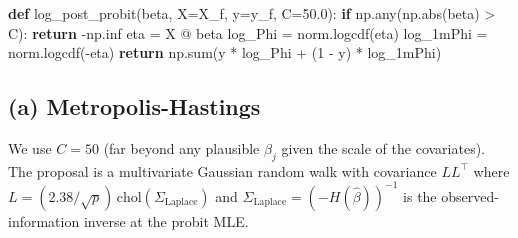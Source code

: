 \documentclass[
  letterpaper,
  DIV=11,
  numbers=noendperiod]{scrartcl}
\newenvironment{Shaded}{\begin{snugshade}}{\end{snugshade}}
\newcommand{\BuiltInTok}[1]{\textcolor[rgb]{0.00,0.23,0.31}{#1}}
\newcommand{\ControlFlowTok}[1]{\textcolor[rgb]{0.00,0.23,0.31}{\textbf{#1}}}
\newcommand{\DecValTok}[1]{\textcolor[rgb]{0.68,0.00,0.00}{#1}}
\newcommand{\FloatTok}[1]{\textcolor[rgb]{0.68,0.00,0.00}{#1}}
\newcommand{\KeywordTok}[1]{\textcolor[rgb]{0.00,0.23,0.31}{\textbf{#1}}}
\newcommand{\NormalTok}[1]{\textcolor[rgb]{0.00,0.23,0.31}{#1}}
\newcommand{\OperatorTok}[1]{\textcolor[rgb]{0.37,0.37,0.37}{#1}}
\begin{document}
\begin{Shaded}
\begin{Highlighting}[]
\KeywordTok{def}\NormalTok{ log\_post\_probit(beta, X}\OperatorTok{=}\NormalTok{X\_f, y}\OperatorTok{=}\NormalTok{y\_f, C}\OperatorTok{=}\FloatTok{50.0}\NormalTok{):}
    \ControlFlowTok{if}\NormalTok{ np.}\BuiltInTok{any}\NormalTok{(np.}\BuiltInTok{abs}\NormalTok{(beta) }\OperatorTok{\textgreater{}}\NormalTok{ C):}
        \ControlFlowTok{return} \OperatorTok{{-}}\NormalTok{np.inf}
\NormalTok{    eta }\OperatorTok{=}\NormalTok{ X }\OperatorTok{@}\NormalTok{ beta}
\NormalTok{    log\_Phi   }\OperatorTok{=}\NormalTok{ norm.logcdf(eta)}
\NormalTok{    log\_1mPhi }\OperatorTok{=}\NormalTok{ norm.logcdf(}\OperatorTok{{-}}\NormalTok{eta)}
    \ControlFlowTok{return}\NormalTok{ np.}\BuiltInTok{sum}\NormalTok{(y }\OperatorTok{*}\NormalTok{ log\_Phi }\OperatorTok{+}\NormalTok{ (}\DecValTok{1} \OperatorTok{{-}}\NormalTok{ y) }\OperatorTok{*}\NormalTok{ log\_1mPhi)}
\end{Highlighting}
\end{Shaded}

\subsection{(a) Metropolis-Hastings}\label{a-metropolis-hastings}

We use \(C=50\) (far beyond any plausible \(\beta_j\) given the scale of
the covariates). The proposal is a multivariate Gaussian random walk
with covariance \(L L^\top\) where
\(L = (2.38/\sqrt{p})\,\text{chol}(\Sigma_{\text{Laplace}})\) and
\(\Sigma_{\text{Laplace}} = (-H(\hat\beta))^{-1}\) is the
observed-information inverse at the probit MLE.
\end{document}
